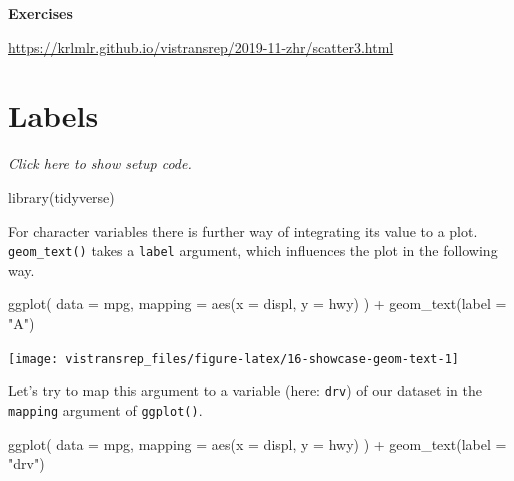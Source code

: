 \documentclass[]{book}
\newenvironment{Shaded}{}{}
\newcommand{\DataTypeTok}[1]{#1}
\newcommand{\KeywordTok}[1]{\textcolor[rgb]{0.00,0.00,1.00}{#1}}
\newcommand{\NormalTok}[1]{#1}
\newcommand{\OperatorTok}[1]{#1}
\newcommand{\StringTok}[1]{\textcolor[rgb]{0.00,0.50,0.50}{#1}}
\begin{document}
\textbf{Exercises}

\url{https://krlmlr.github.io/vistransrep/2019-11-zhr/scatter3.html}

\hypertarget{labels}{%
\section{Labels}\label{labels}}

\emph{Click here to show setup code.}

\begin{Shaded}
\begin{Highlighting}[]
\KeywordTok{library}\NormalTok{(tidyverse)}
\end{Highlighting}
\end{Shaded}

For character variables there is further way of integrating its value to a plot.
\texttt{geom\_text()} takes a \texttt{label} argument, which influences the plot in the following way.

\begin{Shaded}
\begin{Highlighting}[]
\KeywordTok{ggplot}\NormalTok{(}
  \DataTypeTok{data =}\NormalTok{ mpg,}
  \DataTypeTok{mapping =} \KeywordTok{aes}\NormalTok{(}\DataTypeTok{x =}\NormalTok{ displ, }\DataTypeTok{y =}\NormalTok{ hwy)}
\NormalTok{) }\OperatorTok{+}
\StringTok{  }\KeywordTok{geom_text}\NormalTok{(}\DataTypeTok{label =} \StringTok{"A"}\NormalTok{)}
\end{Highlighting}
\end{Shaded}

\begin{flushright}\texttt{[image: vistransrep\_files/figure-latex/16-showcase-geom-text-1]} \end{flushright}

Let's try to map this argument to a variable (here: \texttt{drv}) of our dataset in the \texttt{mapping} argument of \texttt{ggplot()}.

\begin{Shaded}
\begin{Highlighting}[]
\KeywordTok{ggplot}\NormalTok{(}
  \DataTypeTok{data =}\NormalTok{ mpg,}
  \DataTypeTok{mapping =} \KeywordTok{aes}\NormalTok{(}\DataTypeTok{x =}\NormalTok{ displ, }\DataTypeTok{y =}\NormalTok{ hwy)}
\NormalTok{) }\OperatorTok{+}
\StringTok{  }\KeywordTok{geom_text}\NormalTok{(}\DataTypeTok{label =} \StringTok{"drv"}\NormalTok{)}
\end{Highlighting}
\end{Shaded}
\end{document}
